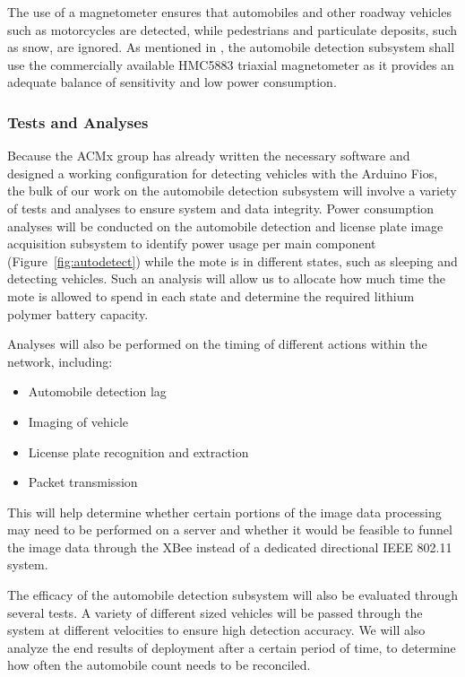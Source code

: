 \documentclass[11pt, oneside, fullpage, doublespace]{article}
\begin{document}
The use of a magnetometer ensures that automobiles and other roadway vehicles such as motorcycles are detected, while pedestrians and particulate deposits, such as snow, are ignored. As mentioned in \cite{stillwell2013}, the automobile detection subsystem shall use the commercially available HMC5883 triaxial magnetometer as it provides an adequate balance of sensitivity and low power consumption.

\subsubsection{Tests and Analyses}
Because the ACMx group has already written the necessary software and designed a working configuration for detecting vehicles with the Arduino Fios, the bulk of our work on the automobile detection subsystem will involve a variety of tests and analyses to ensure system and data integrity. Power consumption analyses will be conducted on the automobile detection and license plate image acquisition subsystem to identify power usage per main component (Figure~\ref{fig:autodetect}) while the mote is in different states, such as sleeping and detecting vehicles. Such an analysis will allow us to allocate how much time the mote is allowed to spend in each state and determine the required lithium polymer battery capacity.

Analyses will also be performed on the timing of different actions within the network, including:
\begin{itemize}
\item Automobile detection lag
\item Imaging of vehicle
\item License plate recognition and extraction
\item Packet transmission
\end{itemize}
This will help determine whether certain portions of the image data processing may need to be performed on a server and whether it would be feasible to funnel the image data through the XBee instead of a dedicated directional IEEE 802.11 system.

The efficacy of the automobile detection subsystem will also be evaluated through several tests. A variety of different sized vehicles will be passed through the system at different velocities to ensure high detection accuracy. We will also analyze the end results of deployment after a certain period of time, to determine how often the automobile count needs to be reconciled.
\end{document}

